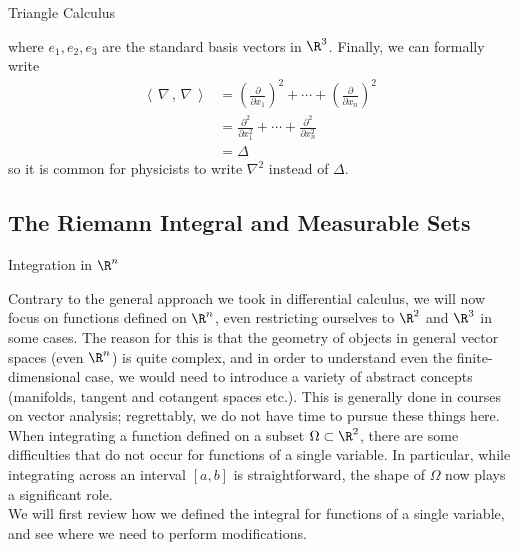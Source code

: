 \documentclass[smaller,hyperref={CJKbookmarks=true}]{beamer}
\newcommand{\scp}[2]{\left\langle\,#1\,,\,#2\,\right\rangle} \newcommand{\scpp}{\langle\,\cdot\,,\,\cdot\,\rangle}
\begin{document}
\begin{frame}{Triangle Calculus}
\begin{spacing}{1.1}
where $e_1,e_2,e_3$ are the standard basis vectors in $\R^3$. Finally, we can formally write
\begin{equation*}
  \begin{split}
     \scp{\nabla}{\nabla} &=\left(\frac{\partial}{\partial x_1}\right)^2+\cdots+\left(\frac{\partial}{\partial x_n}\right)^2 \\
       &=\frac{\partial^2}{\partial x_1^2}+\cdots+\frac{\partial^2}{\partial x_n^2} \\
       &=\Delta
  \end{split}
\end{equation*}
so it is common for physicists to write $\nabla^2$ instead of $\Delta$.
\end{spacing}
\end{frame}
\subsection{The Riemann Integral and Measurable Sets}
\begin{frame}[c]
\begin{spacing}{2.5}
\tableofcontents[sectionstyle=hide,subsectionstyle=show/shaded/hide]
\end{spacing}
\end{frame}
\begin{frame}[t]{Integration in $\R^n$}
\begin{spacing}{1.2}
Contrary to the general approach we took in dif{}ferential calculus, we will
now focus on functions defined on $\R^n$, even restricting ourselves to $\R^2$ and $\R^3$ in some cases. The reason for this is that the geometry of objects in
general vector spaces (even $\R^n$) is quite complex, and in order to
understand even the finite-dimensional case, we would need to introduce a
variety of abstract concepts (manifolds, tangent and cotangent spaces
etc.). This is generally done in courses on vector analysis; regrettably, we
do not have time to pursue these things here.\\[4pt]
When integrating a function defined on a subset $\Omega\subset\R^2$, there are some
dif{}ficulties that do not occur for functions of a single variable. In
particular, while integrating across an interval $[a,b]$ is straightforward, the shape of $\Omega$ now plays a significant role.\\[4pt]
We will first review how we defined the integral for functions of a single
variable, and see where we need to perform modifications.
\end{spacing}
\end{frame}
\end{document}
